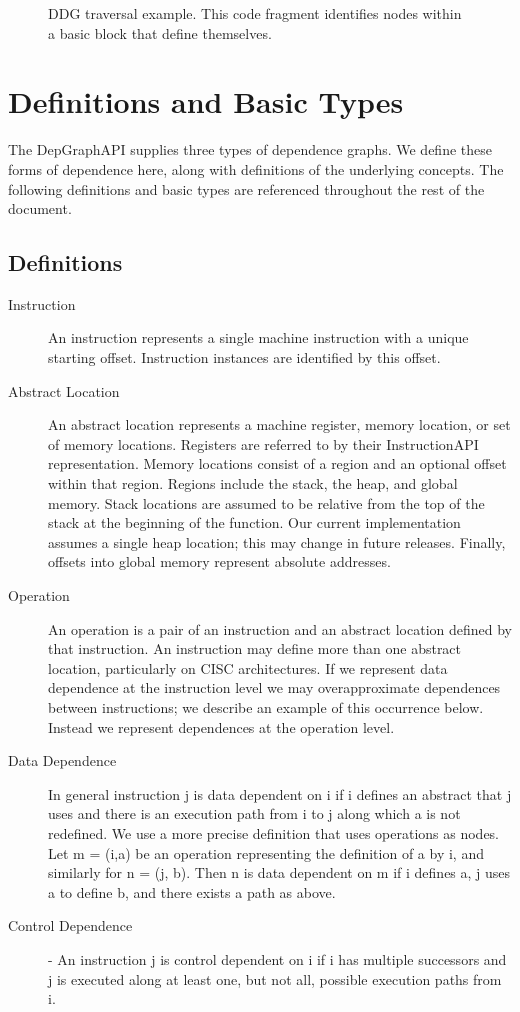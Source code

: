\documentclass[12pt,titlepage]{article}
\begin{document}
\begin{figure}\label{example2}

\caption{DDG traversal example. This code fragment identifies nodes
  within a basic block that define themselves.}
\end{figure}


\section{Definitions and Basic Types}

The DepGraphAPI supplies three types of dependence graphs. We define
these forms of dependence here, along with definitions of the
underlying concepts. The following definitions and basic types are
referenced throughout the rest of the document.

\subsection{Definitions}
\begin{description}
\item[Instruction] An instruction represents a single machine
instruction with a unique starting offset. Instruction instances are
identified by this offset.
\item[Abstract Location] An abstract location represents a machine
register, memory location, or set of memory locations. Registers are
referred to by their InstructionAPI representation. Memory locations
consist of a region and an optional offset within that region. Regions
include the stack, the heap, and global memory. Stack locations are
assumed to be relative from the top of the stack at the beginning of
the function. Our current implementation assumes a single heap
location; this may change in future releases. Finally, offsets into
global memory represent absolute addresses.
\item[Operation] An operation is a pair of an instruction and an
abstract location defined by that instruction. An instruction may
define more than one abstract location, particularly on CISC
architectures. If we represent data dependence at the instruction
level we may overapproximate dependences between instructions; we
describe an example of this occurrence below. Instead we represent
dependences at the operation level.
\item[Data Dependence] In general instruction j is data dependent on i
if i defines an abstract that j uses and there is an execution path
from i to j along which a is not redefined. We use a more precise
definition that uses operations as nodes. Let m = (i,a) be an
operation representing the definition of a by i, and similarly for n =
(j, b). Then n is data dependent on m if i defines a, j uses a to
define b, and there exists a path as above.
\item[Control Dependence] - An instruction j is control dependent on i
if i has multiple successors and j is executed along at least one, but
not all, possible execution paths from i.
\end{description}
\end{document}
